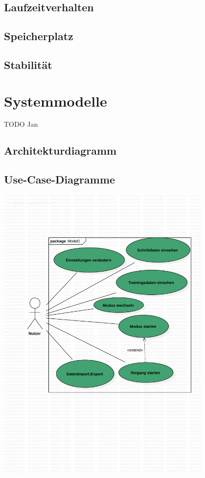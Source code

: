 \documentclass[a4paper,12pt]{article}
\begin{document}
\subsection{Laufzeitverhalten}
\subsection{Speicherplatz}
\subsection{Stabilität}

\section{Systemmodelle}
TODO Jan
  \subsection{Architekturdiagramm}
  \subsection{Use-Case-Diagramme}
\begin{center}
\includegraphics[width=0.8\textwidth]{Vorlaeufiges Use-Case Diagram.pdf}
\end{center}
\end{document}
